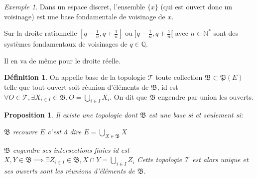 \documentclass[a4paper, 11pt, french]{book}
\newenvironment{itemise}{\itemize}{\enditemize}
\theoremstyle{plain} %
\newtheorem{proposition}{Proposition}
\theoremstyle{definition} %
\newtheorem{definition}{Définition}
\theoremstyle{remark} %
\newtheorem{exemple}{Exemple}
\newcommand{\1}{\mathds{1}}
\newcommand{\N}{\mathbb{N}}
\newcommand{\Q}{\mathbb{Q}}
\begin{document}
\begin{exemple}
	\begin{itemise}
		\item Dans un espace discret, l'ensemble $\{x\}$ (qui est ouvert donc un voisinage) est une base fondamentale de voisinage de $x$.
		\item Sur la droite rationnelle $[q-\frac{1}{n}, q+\frac{1}{n}]$ ou $]q-\frac{1}{n}, q+\frac{1}{n}[$ avec $n\in\N^*$ sont des systèmes fondamentaux de voisinages de $q\in\Q$.
		\item Il en va de même pour le droite réelle.
	\end{itemise}
\end{exemple}

\begin{definition}
	On appelle base de la topologie $\mathscr{T}$ toute collection $\mathfrak{B}\subset\mathfrak{P}(E)$ telle que tout ouvert soit réunion d'éléments de $\mathfrak{B}$, id est $\forall O\in\mathscr{T}, \exists X_{i\in I}\in\mathfrak{B}, O=\bigcup_{i\in I} X_i$.
	On dit que $\mathfrak{B}$ engendre par union les ouverts.
\end{definition}

\begin{proposition}
	Il existe une topologie dont $\mathfrak{B}$ est une base si et seulement si:
	\begin{itemise}
		\item $\mathfrak{B}$ recouvre $E$ c'est à dire $E=\bigcup_{X\in\mathfrak{B}}X$
		\item $\mathfrak{B}$ engendre ses intersections finies id est $X, Y\in\mathfrak{B}\implies\exists Z_{i\in I}\in\mathfrak{B}, X\cap Y=\bigcup_{i\in I}Z_i$
	\end{itemise}
	Cette topologie $\mathscr{T}$ est alors unique et ses ouverts sont les réunions d'éléments de $\mathfrak{B}$.
\end{proposition}
\end{document}
